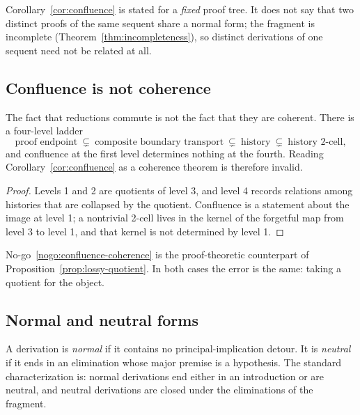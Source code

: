 \begin{remark}
Corollary~\ref{cor:confluence} is stated for a \emph{fixed} proof tree.  It does not say
that two distinct proofs of the same sequent share a normal form; the fragment is
incomplete (Theorem~\ref{thm:incompleteness}), so distinct derivations of one sequent need
not be related at all.
\end{remark}

\subsection{Confluence is not coherence}

\begin{nogo}\label{nogo:confluence-coherence}
The fact that reductions commute is not the fact that they are coherent.  There is a
four-level ladder
\[
  \text{proof endpoint}\ \subsetneq\ \text{composite boundary transport}\ \subsetneq\
  \text{history}\ \subsetneq\ \text{history 2-cell},
\]
and confluence at the first level determines nothing at the fourth.  Reading
Corollary~\ref{cor:confluence} as a coherence theorem is therefore invalid.
\end{nogo}

\begin{proof}
Levels 1 and 2 are quotients of level 3, and level 4 records relations among histories
that are collapsed by the quotient.  Confluence is a statement about the image at level 1;
a nontrivial 2-cell lives in the kernel of the forgetful map from level 3 to level 1, and
that kernel is not determined by level 1.
\end{proof}

\begin{remark}
No-go~\ref{nogo:confluence-coherence} is the proof-theoretic counterpart of
Proposition~\ref{prop:lossy-quotient}.  In both cases the error is the same: taking a
quotient for the object.
\end{remark}

\subsection{Normal and neutral forms}

\begin{definition}\label{def:normal-neutral}
A derivation is \emph{normal} if it contains no principal-implication detour.  It is
\emph{neutral} if it ends in an elimination whose major premise is a hypothesis.  The
standard characterization is: normal derivations end either in an introduction or are
neutral, and neutral derivations are closed under the eliminations of the fragment.
\end{definition}

